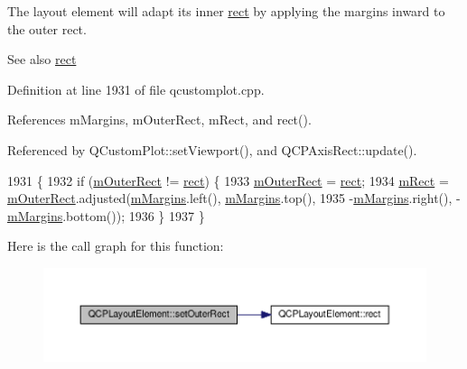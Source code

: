 The layout element will adapt its inner \hyperlink{class_q_c_p_layout_element_affdfea003469aac3d0fac5f4e06171bc}{rect} by applying the margins inward to the outer rect.

\begin{DoxySeeAlso}{See also}
\hyperlink{class_q_c_p_layout_element_affdfea003469aac3d0fac5f4e06171bc}{rect} 
\end{DoxySeeAlso}


Definition at line 1931 of file qcustomplot.\+cpp.



References m\+Margins, m\+Outer\+Rect, m\+Rect, and rect().



Referenced by Q\+Custom\+Plot\+::set\+Viewport(), and Q\+C\+P\+Axis\+Rect\+::update().


\begin{DoxyCode}
1931                                                      \{
1932   \textcolor{keywordflow}{if} (\hyperlink{class_q_c_p_layout_element_a07bb4973379e75cb0fa5b032c1d24afd}{mOuterRect} != \hyperlink{class_q_c_p_layout_element_affdfea003469aac3d0fac5f4e06171bc}{rect}) \{
1933     \hyperlink{class_q_c_p_layout_element_a07bb4973379e75cb0fa5b032c1d24afd}{mOuterRect} = \hyperlink{class_q_c_p_layout_element_affdfea003469aac3d0fac5f4e06171bc}{rect};
1934     \hyperlink{class_q_c_p_layout_element_ad8896f05550389f7b9e92c9e6cdf6e01}{mRect} = \hyperlink{class_q_c_p_layout_element_a07bb4973379e75cb0fa5b032c1d24afd}{mOuterRect}.adjusted(\hyperlink{class_q_c_p_layout_element_ac2a32b99ee527ca5dfff9da03628fe94}{mMargins}.left(), \hyperlink{class_q_c_p_layout_element_ac2a32b99ee527ca5dfff9da03628fe94}{mMargins}.top(),
1935                                 -\hyperlink{class_q_c_p_layout_element_ac2a32b99ee527ca5dfff9da03628fe94}{mMargins}.right(), -\hyperlink{class_q_c_p_layout_element_ac2a32b99ee527ca5dfff9da03628fe94}{mMargins}.bottom());
1936   \}
1937 \}
\end{DoxyCode}


Here is the call graph for this function\+:\nopagebreak
\begin{figure}[H]
\begin{center}
\leavevmode
\includegraphics[width=350pt]{class_q_c_p_layout_element_a38975ea13e36de8e53391ce41d94bc0f_cgraph}
\end{center}
\end{figure}




